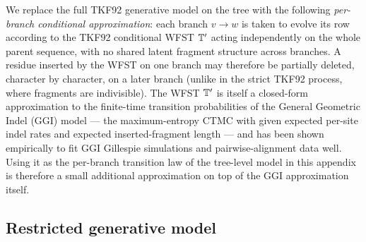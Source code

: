We replace the full TKF92 generative model on the tree with the
following \emph{per-branch conditional approximation}:
each branch $v \to w$ is taken to evolve its row according to the
TKF92 conditional WFST $\mathbb{T}'$ acting independently on the whole
parent sequence, with no shared latent fragment structure across
branches.
A residue inserted by the WFST on one branch may therefore be
partially deleted, character by character, on a later branch
(unlike in the strict TKF92 process, where fragments are indivisible).
The WFST $\mathbb{T}'$ is itself a closed-form approximation to the
finite-time transition probabilities of the General Geometric Indel
(GGI) model — the maximum-entropy CTMC with given expected per-site
indel rates and expected inserted-fragment length — and has been
shown empirically to fit GGI Gillespie simulations
\cite{Holmes2020} and pairwise-alignment data
\cite{LargeHolmes2026} well.
Using it as the per-branch transition law of the tree-level model in
this appendix is therefore a small additional approximation on top of
the GGI approximation itself.

\subsection{Restricted generative model}
\label{sec:varanc-presence-restricted}

